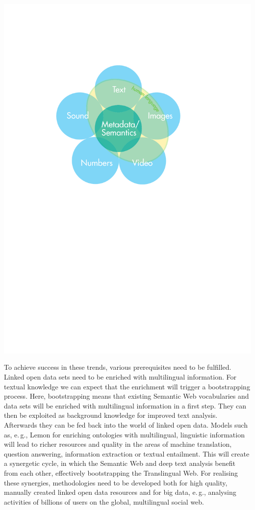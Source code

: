 \documentclass[10pt, plain]{../../metanetpaper}
\newenvironment{Figure}
  {\par\bigskip\noindent\minipage{\linewidth}}
  {\endminipage\par\bigskip}
\begin{document}
\begin{multicols}{2}
\begin{Figure}
  \centering
  \includegraphics[width=.65\textwidth]{../_media/TypesOfData.pdf}
  \label{fig:language-and-data}
\end{Figure}


To achieve success in these trends, various prerequisites need to be fulfilled. Linked open data sets need to be enriched with multilingual information. For textual knowledge we can expect that the enrichment will trigger a bootstrapping process. Here, bootstrapping means that existing Semantic Web vocabularies and data sets will be enriched with multilingual information in a first step. They can then be exploited as background knowledge for improved text analysis. Afterwards they can be fed back into the world of linked open data. Models such as, e.\,g., Lemon for enriching ontologies with multilingual, linguistic information will lead to richer resources and quality in the areas of machine translation, question answering, information extraction or textual entailment. This will create a synergetic cycle, in which the Semantic Web and deep text analysis benefit from each other, effectively bootstrapping the Translingual Web. For realising these synergies, methodologies need to be developed both for high quality, manually created linked open data resources and for big data, e.\,g., analysing activities of billions of users on the global, multilingual social web.


\end{multicols}
\end{document}
